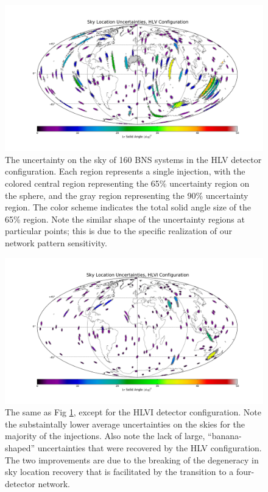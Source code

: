 \documentclass[11pt,a4paper]{emulateapj}
\begin{document}
\begin{figure}[ht!]
  \centering
 \includegraphics[angle=0,scale=0.4, trim=5cm 2cm 3cm 0cm]{HLVsky.pdf}
 \caption{The uncertainty on the sky of 160 BNS systems in the HLV detector configuration.  Each region represents a single injection, with the colored central region representing the 65\% uncertainty region on the sphere, and the gray region representing the 90\% uncertainty region.  The color scheme indicates the total solid angle size of the 65\% region.  Note the similar shape of the uncertainty regions at particular points; this is due to the specific realization of our network pattern sensitivity.}
 \label{2525SkyLocHLV}
\end{figure}

\begin{figure}[ht!]
  \centering
 \includegraphics[angle=0,scale=0.4, trim=5cm 2cm 3cm 0cm]{HLVIsky.pdf}
 \caption{The same as Fig \ref{2525SkyLocHLV}, except for the HLVI detector configuration.  Note the substaintally lower average uncertainties on the skies for the majority of the injections.  Also note the lack of large, ``banana-shaped'' uncertainties that were recovered by the HLV configuration.  The two improvements are due to the breaking of the degeneracy in sky location recovery that is facilitated by the transition to a four-detector network.} 
 \label{2525SkyLocHLVI}
\end{figure}
  
\end{document}
